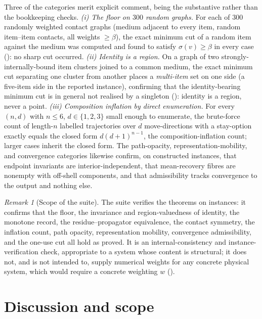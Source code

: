 \documentclass[11pt,a4paper]{article}
\theoremstyle{thmstyle}
\theoremstyle{definition}
\theoremstyle{remark}
\newtheorem{remark}[theorem]{Remark}
\newcommand{\wt}{w}
\newcommand{\flo}{\beta}                 %
\newcommand{\str}{\sigma}                %
\begin{document}
Three of the categories merit explicit comment, being the substantive
rather than the bookkeeping checks. \emph{(i) The floor on $300$ random
graphs.} For each of $300$ randomly weighted contact graphs (medium
adjacent to every item, random item--item contacts, all weights
$\ge\flo$), the exact minimum cut of a random item against the medium was
computed and found to satisfy $\str(v)\ge\flo$ in every case
(): no sharp cut occurred. \emph{(ii) Identity is a
region.} On a graph of two strongly-internally-bound item clusters joined
to a common medium, the exact minimum cut separating one cluster from
another places a \emph{multi-item} set on one side (a five-item side in the
reported instance), confirming that the identity-bearing minimum cut is in
general not realised by a singleton (): identity is a
region, never a point. \emph{(iii) Composition inflation by direct
enumeration.} For every $(n,d)$ with $n\le6$, $d\in\{1,2,3\}$ small enough
to enumerate, the brute-force count of length-$n$ labelled trajectories
over $d$ move-directions with a stay-option exactly equals the closed form
$d(d+1)^{n-1}$, the composition-inflation count; larger cases inherit the
closed form. The path-opacity, representation-mobility, and convergence
categories likewise confirm, on constructed instances, that endpoint
invariants are interior-independent, that mean-recovery fibres are
nonempty with off-shell components, and that admissibility tracks
convergence to the output and nothing else.

\begin{remark}[Scope of the suite]
\label{rem:validation-scope}
The suite verifies the theorems on instances: it confirms that the floor,
the invariance and region-valuedness of identity, the monotone record, the
residue--propagator equivalence, the contact symmetry, the inflation
count, path opacity, representation mobility, convergence admissibility,
and the one-use cut all hold as proved. It is an internal-consistency and
instance-verification check, appropriate to a system whose content is
structural; it does not, and is not intended to, supply numerical weights
for any concrete physical system, which would require a concrete weighting
$\wt$ ().
\end{remark}

\section{Discussion and scope}
\label{sec:discussion}
\end{document}

